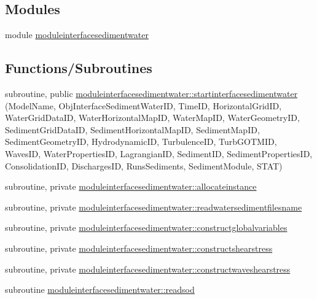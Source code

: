\subsection*{Modules}
\begin{DoxyCompactItemize}
\item 
module \mbox{\hyperlink{namespacemoduleinterfacesedimentwater}{moduleinterfacesedimentwater}}
\end{DoxyCompactItemize}
\subsection*{Functions/\+Subroutines}
\begin{DoxyCompactItemize}
\item 
subroutine, public \mbox{\hyperlink{namespacemoduleinterfacesedimentwater_ac4816996443451e1d6254c032bf000d5}{moduleinterfacesedimentwater\+::startinterfacesedimentwater}} (Model\+Name, Obj\+Interface\+Sediment\+Water\+ID, Time\+ID, Horizontal\+Grid\+ID, Water\+Grid\+Data\+ID, Water\+Horizontal\+Map\+ID, Water\+Map\+ID, Water\+Geometry\+ID, Sediment\+Grid\+Data\+ID, Sediment\+Horizontal\+Map\+ID, Sediment\+Map\+ID, Sediment\+Geometry\+ID, Hydrodynamic\+ID, Turbulence\+ID, Turb\+G\+O\+T\+M\+ID, Waves\+ID, Water\+Properties\+ID, Lagrangian\+ID, Sediment\+ID, Sediment\+Properties\+ID, Consolidation\+ID, Discharges\+ID, Runs\+Sediments, Sediment\+Module, S\+T\+AT)
\item 
subroutine, private \mbox{\hyperlink{namespacemoduleinterfacesedimentwater_ab65f957bafcb50f6f38a075ca13833de}{moduleinterfacesedimentwater\+::allocateinstance}}
\item 
subroutine, private \mbox{\hyperlink{namespacemoduleinterfacesedimentwater_a11b9e14e9187da0c2c8bc38302ec8e95}{moduleinterfacesedimentwater\+::readwatersedimentfilesname}}
\item 
subroutine, private \mbox{\hyperlink{namespacemoduleinterfacesedimentwater_a6f12890d7a3c41413a03f74cc366bd1a}{moduleinterfacesedimentwater\+::constructglobalvariables}}
\item 
subroutine, private \mbox{\hyperlink{namespacemoduleinterfacesedimentwater_afdce65eb974d56a59cfb4d3ba2145d99}{moduleinterfacesedimentwater\+::constructshearstress}}
\item 
subroutine, private \mbox{\hyperlink{namespacemoduleinterfacesedimentwater_a068eb47dacf7b4047f132db2a3fd8022}{moduleinterfacesedimentwater\+::constructwaveshearstress}}
\item 
subroutine \mbox{\hyperlink{namespacemoduleinterfacesedimentwater_a86923875b20b0ddacafa24243a465222}{moduleinterfacesedimentwater\+::readsod}}

\end{DoxyCompactItemize}
